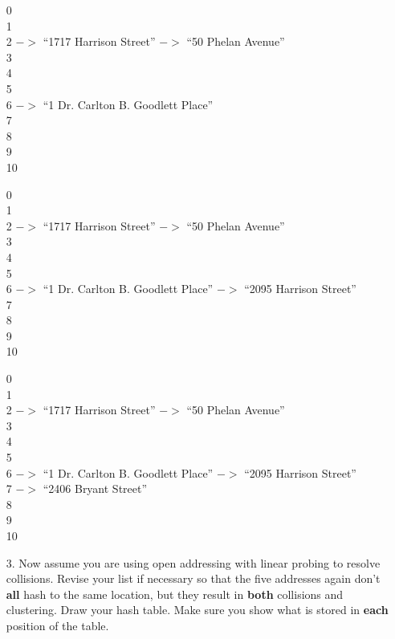 \documentclass[10pt]{article}
\begin{document}
\begin{enumerate}
			\vspace{0.5cm}
			0\\  
			1\\  
			2 $->$ ``1717 Harrison Street'' $->$ ``50 Phelan Avenue''\\  
			3\\  
			4\\  
			5\\  
			6 $->$ ``1 Dr. Carlton B. Goodlett Place''\\  
			7\\  
			8\\  
			9\\  
			10
						
			\vspace{0.5cm}
			0 \\
			1 \\
			2 $->$ ``1717 Harrison Street'' $->$ ``50 Phelan Avenue'' \\
			3 \\
			4 \\
			5 \\
			6 $->$ ``1 Dr. Carlton B. Goodlett Place'' $->$ ``2095 Harrison Street'' \\
			7 \\
			8 \\
			9 \\
			10
			
			\vspace{0.5cm}
			0\\  
			1\\  
			2 $->$ ``1717 Harrison Street'' $->$ ``50 Phelan Avenue''\\  
			3\\  
			4\\  
			5\\  
			6 $->$ ``1 Dr. Carlton B. Goodlett Place'' $->$ ``2095 Harrison Street''\\  
			7 $->$ ``2406 Bryant Street''\\  
			8\\  
			9\\  
			10
		
		\item[3.] Now assume you are using open addressing with linear probing to resolve collisions. Revise your list if necessary so that the five addresses again don't \textbf{all} hash to the same location, but they result in \textbf{both} collisions and clustering. Draw your hash table. Make sure you show what is stored in \textbf{each} position of the table.
			

\end{enumerate}
\end{document}
